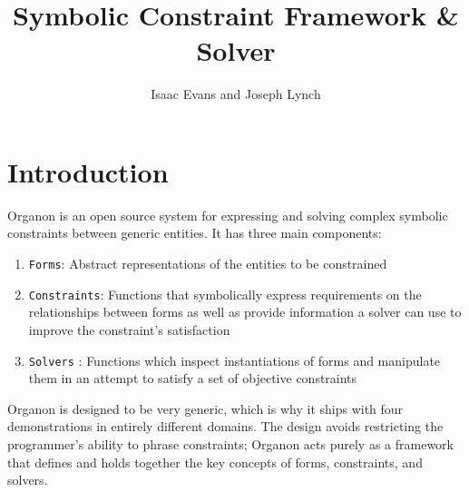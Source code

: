 \documentclass[12pt,a4paper]{article}
\author{Isaac Evans and Joseph Lynch}
\title{\LARGE Symbolic Constraint Framework \& Solver}
\begin{document}

\lstset{
 language=Scheme
}

\maketitle
\newpage
\tableofcontents
\newpage
\section{Introduction}
Organon is an open source system for expressing and solving complex symbolic constraints between generic entities. It has three main components: 
\begin{enumerate}
\item \texttt{Forms}: Abstract representations of the entities to be constrained
\item \texttt{Constraints}: Functions that symbolically express requirements on the relationships between forms as well as provide information a solver can use to improve the constraint's satisfaction
\item \texttt{Solvers} : Functions which inspect instantiations of forms and manipulate them in an attempt to satisfy a set of objective constraints
\end{enumerate}

Organon is designed to be very generic, which is why it ships with four demonstrations in entirely different domains. The design avoids restricting the programmer's ability to phrase constraints; Organon acts purely as a framework that defines and holds together the key concepts of forms, constraints, and solvers.
\end{document}
